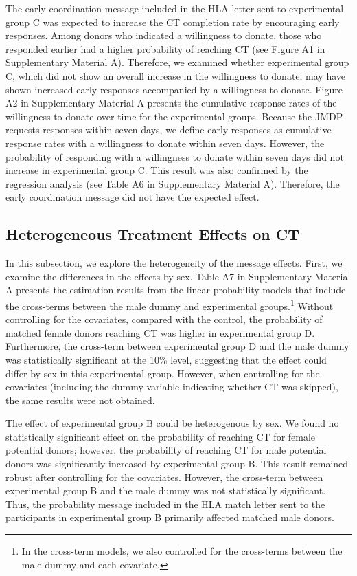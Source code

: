 \documentclass[12pt, a4paper]{article}
\begin{document}
The early coordination message included in the HLA letter sent to experimental group C was expected to increase the CT completion rate by encouraging early responses. Among donors who indicated a willingness to donate, those who responded earlier had a higher probability of reaching CT (see Figure A1 in Supplementary Material A). Therefore, we examined whether experimental group C, which did not show an overall increase in the willingness to donate, may have shown increased early responses accompanied by a willingness to donate. Figure A2 in Supplementary Material A presents the cumulative response rates of the willingness to donate over time for the experimental groups. Because the JMDP requests responses within seven days, we define early responses as cumulative response rates with a willingness to donate within seven days. However, the probability of responding with a willingness to donate within seven days did not increase in experimental group C. This result was also confirmed by the regression analysis (see Table A6 in Supplementary Material A). Therefore, the early coordination message did not have the expected effect.

\hypertarget{heterogeneous-treatment-effects-on-ct}{%
\subsection{Heterogeneous Treatment Effects on CT}\label{heterogeneous-treatment-effects-on-ct}}

In this subsection, we explore the heterogeneity of the message effects. First, we examine the differences in the effects by sex. Table A7 in Supplementary Material A presents the estimation results from the linear probability models that include the cross-terms between the male dummy and experimental groups.\footnote{In the cross-term models, we also controlled for the cross-terms between the male dummy and each covariate.} Without controlling for the covariates, compared with the control, the probability of matched female donors reaching CT was higher in experimental group D. Furthermore, the cross-term between experimental group D and the male dummy was statistically significant at the 10\% level, suggesting that the effect could differ by sex in this experimental group. However, when controlling for the covariates (including the dummy variable indicating whether CT was skipped), the same results were not obtained.

The effect of experimental group B could be heterogenous by sex. We found no statistically significant effect on the probability of reaching CT for female potential donors; however, the probability of reaching CT for male potential donors was significantly increased by experimental group B. This result remained robust after controlling for the covariates. However, the cross-term between experimental group B and the male dummy was not statistically significant. Thus, the probability message included in the HLA match letter sent to the participants in experimental group B primarily affected matched male donors.
\end{document}
